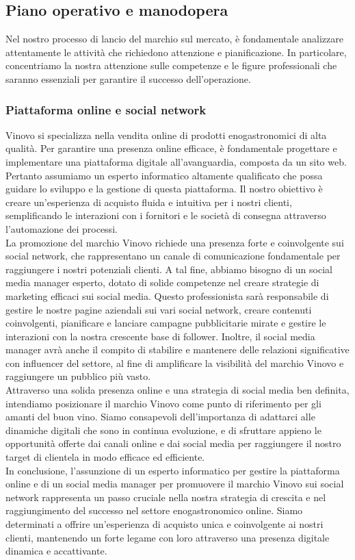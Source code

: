 \documentclass[12pt, a4paper]{article}
\newcommand{\meskip}{\medskip \\}
\begin{document}
\subsection{Piano operativo e manodopera}

Nel nostro processo di lancio del marchio sul mercato, è fondamentale analizzare attentamente le attività che richiedono attenzione e pianificazione. In particolare, concentriamo la nostra attenzione sulle competenze e le figure professionali che saranno essenziali per garantire il successo dell'operazione.

\subsubsection{Piattaforma online e social network}

Vinovo si specializza nella vendita online di prodotti enogastronomici di alta qualità. Per garantire una presenza online efficace, è fondamentale progettare e implementare una piattaforma digitale all'avanguardia, composta da un sito web. Pertanto assumiamo un esperto informatico altamente qualificato che possa guidare lo sviluppo e la gestione di questa piattaforma. Il nostro obiettivo è creare un'esperienza di acquisto fluida e intuitiva per i nostri clienti, semplificando le interazioni con i fornitori e le società di consegna attraverso l'automazione dei processi.\meskip
La promozione del marchio Vinovo richiede una presenza forte e coinvolgente sui social network, che rappresentano un canale di comunicazione fondamentale per raggiungere i nostri potenziali clienti. A tal fine, abbiamo bisogno di un social media manager esperto, dotato di solide competenze nel creare strategie di marketing efficaci sui social media. Questo professionista sarà responsabile di gestire le nostre pagine aziendali sui vari social network, creare contenuti coinvolgenti, pianificare e lanciare campagne pubblicitarie mirate e gestire le interazioni con la nostra crescente base di follower. Inoltre, il social media manager avrà anche il compito di stabilire e mantenere delle relazioni significative con influencer del settore, al fine di amplificare la visibilità del marchio Vinovo e raggiungere un pubblico più vasto.\meskip
Attraverso una solida presenza online e una strategia di social media ben definita, intendiamo posizionare il marchio Vinovo come punto di riferimento per gli amanti del buon vino. Siamo consapevoli dell'importanza di adattarci alle dinamiche digitali che sono in continua evoluzione, e di sfruttare appieno le opportunità offerte dai canali online e dai social media per raggiungere il nostro target di clientela in modo efficace ed efficiente.\meskip
In conclusione, l'assunzione di un esperto informatico per gestire la piattaforma online e di un social media manager per promuovere il marchio Vinovo sui social network rappresenta un passo cruciale nella nostra strategia di crescita e nel raggiungimento del successo nel settore enogastronomico online. Siamo determinati a offrire un'esperienza di acquisto unica e coinvolgente ai nostri clienti, mantenendo un forte legame con loro attraverso una presenza digitale dinamica e accattivante.
\end{document}
